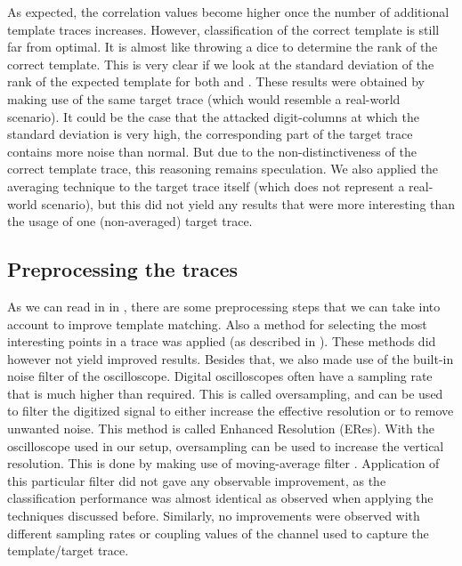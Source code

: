 %
As expected, the correlation values become higher once the number of additional template traces increases.
However, classification of the correct template is still far from optimal.
It is almost like throwing a dice to determine the rank of the correct template.
This is very clear if we look at the standard deviation of the rank of the expected template for both  and . 
These results were obtained by making use of the same target trace (which would resemble a real-world scenario).
It could be the case that the attacked digit-columns at which the standard deviation is very high, the corresponding part of the target trace contains more noise than normal.
But due to the non-distinctiveness of the correct template trace, this reasoning remains speculation.
We also applied the averaging technique to the target trace itself (which does not represent a real-world scenario), but this did not yield any results that were more interesting than the usage of one (non-averaged) target trace.

\subsection{Preprocessing the traces}
As we can read in  in , there are some preprocessing steps that we can take into account to improve template matching.
Also a method for selecting the most interesting points in a trace was applied (as described in ).
These methods did however not yield improved results.
Besides that, we also made use of the built-in noise filter of the oscilloscope.
Digital oscilloscopes often have a sampling rate that is much higher than required.
This is called oversampling, and can be used to filter the digitized signal to either increase the effective resolution or to remove unwanted noise.
This method is called Enhanced Resolution (ERes).
With the oscilloscope used in our setup, oversampling can be used to increase the vertical resolution.
This is done by making use of moving-average filter \cite{waverunner6manual}.
Application of this particular filter did not gave any observable improvement, as the classification performance was almost identical as observed when applying the techniques discussed before.
Similarly, no improvements were observed with different sampling rates or coupling values of the channel used to capture the template/target trace.

